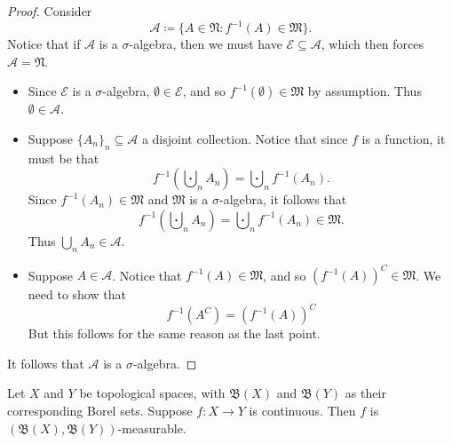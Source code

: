 \documentclass[notoc,notitlepage]{tufte-book}
\begin{document}
\begin{proof}
  Consider
  \begin{equation*}
    \mathcal{A} \coloneqq \{ A \in \mathfrak{N} : f^{-1}(A) \in \mathfrak{M} \}.
  \end{equation*}
  Notice that if $\mathcal{A}$ is a $\sigma$-algebra,
  then we must have $\mathcal{E} \subseteq \mathcal{A}$,
  which then forces $\mathcal{A} = \mathfrak{N}$.

  \noindent
  \begin{itemize}
    \item Since $\mathcal{E}$ is a $\sigma$-algebra, $\emptyset \in \mathcal{E}$,
      and so $f^{-1}(\emptyset) \in \mathfrak{M}$ by assumption.
      Thus $\emptyset \in \mathcal{A}$.
    \item Suppose $\{ A_n \}_n \subseteq \mathcal{A}$ a disjoint collection.
      Notice that since $f$ is a function, it must be that
      \begin{equation*}
        f^{-1} \left( \bigcupdot_{n} A_n \right) = \bigcupdot_{n} f^{-1}(A_n).
      \end{equation*}
      Since $f^{-1}(A_n) \in \mathfrak{M}$ and $\mathfrak{M}$ is a
      $\sigma$-algebra, it follows that
      \begin{equation*}
        f^{-1} \left( \bigcupdot_{n} A_n \right) = \bigcupdot_{n} f^{-1}(A_n)
          \in \mathfrak{M}.
      \end{equation*}
      Thus $\bigcup_{n} A_n \in \mathcal{A}$.
    \item Suppose $A \in \mathcal{A}$.
      Notice that $f^{-1}(A) \in \mathfrak{M}$, and so
      $(f^{-1}(A))^C \in \mathfrak{M}$.
      We need to show that
      \begin{equation*}
        f^{-1}(A^C) = (f^{-1}(A))^C
      \end{equation*}
      But this follows for the same reason as the last point.
  \end{itemize}
  It follows that $\mathcal{A}$ is a $\sigma$-algebra.
\end{proof}

\begin{crly}\label{crly:continuous_functions_on_borel_sets_are_measurable}
  Let $X$ and $Y$ be topological spaces,
  with $\mathfrak{B}(X)$ and $\mathfrak{B}(Y)$ as their corresponding Borel sets.
  Suppose $f : X \to Y$ is continuous.
  Then $f$ is $(\mathfrak{B}(X), \mathfrak{B}(Y))$-measurable.
\end{crly}
\end{document}
